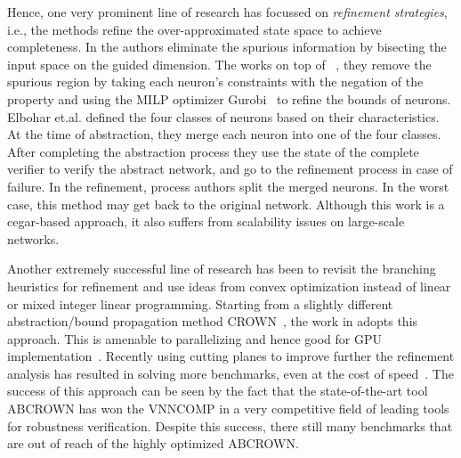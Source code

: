 Hence, one very prominent line of research has focussed on \emph{refinement strategies}, i.e., the methods \cite{wang2018formal,wang2018efficient,elboher2020abstraction,yang2021improving,lin2020art} refine the over-approximated state space to achieve completeness. In \cite{wang2018formal,wang2018efficient,lin2020art} the authors eliminate the spurious information by bisecting the input space on the guided dimension. The \cite{yang2021improving} works on top of \deeppoly{}~\cite{singh2019abstract}, they remove the spurious region by taking each neuron's constraints with the negation of the property and using the MILP optimizer Gurobi~\cite{gurobioptimizer} to refine the bounds of neurons. Elbohar et.al. \cite{elboher2020abstraction} defined the four classes of neurons based on their characteristics. At the time of abstraction, they merge each neuron into one of the four classes.  After completing the abstraction process they use the state of the complete verifier to verify  the abstract network, and go to the refinement process in case of failure.   In the refinement, process authors split the merged neurons.  In the worst case, this method may get back to the original network.  Although this work is a cegar-based approach, it also suffers from scalability issues on large-scale networks. %

Another extremely successful line of research has been to revisit the branching heuristics for refinement and use ideas from convex optimization instead of linear or mixed integer linear programming. Starting from a slightly different abstraction/bound propagation method CROWN~\cite{crown}, the work in \cite{betacrown} adopts this approach. This is amenable to parallelizing and hence good for GPU implementation~\cite{gpucrown}. Recently using cutting planes to improve further the refinement analysis has resulted in solving more benchmarks, even at the cost of speed~\cite{cutting-planes}. The success of this approach can be seen by the fact that the state-of-the-art tool ABCROWN has won the VNNCOMP in a very competitive field of leading tools for robustness verification. Despite this success, there still many benchmarks that are out of reach of the highly optimized ABCROWN.

